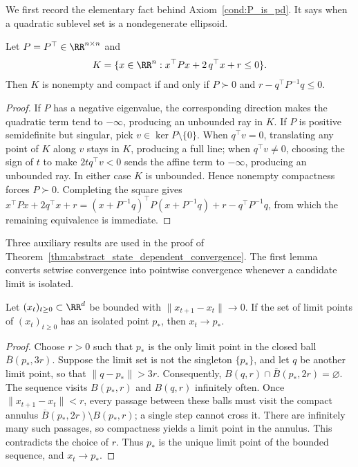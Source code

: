 \documentclass{article}
\begin{document}
We first record the elementary fact behind Axiom~\ref{cond:P_is_pd}. It says when
a quadratic sublevel set is a nondegenerate ellipsoid.

\begin{lemma}\label{lem:compact_quadratic_sublevel}
Let $P=P^\top\in\RR^{n\times n}$ and
\begin{align}
    K = \{x \in \RR^n : x^\top P x + 2\,q^\top x + r \le 0\}.
\end{align}
Then $K$ is nonempty and compact if and only if $P\succ 0$ and
$r - q^\top P^{-1}q \le 0$.
\end{lemma}

\begin{proof}
If $P$ has a negative eigenvalue, the corresponding direction makes the
quadratic term tend to $-\infty$, producing an unbounded ray in $K$.
If $P$ is positive semidefinite but singular, pick $v\in\ker P\setminus\{0\}$.
When $q^\top v=0$, translating any point of $K$ along $v$ stays in $K$,
producing a full line; when $q^\top v\ne 0$, choosing the sign of $t$ to
make $2tq^\top v<0$ sends the affine term to $-\infty$, producing an
unbounded ray. In either case $K$ is unbounded. Hence nonempty
compactness forces $P\succ 0$. Completing the square gives
$x^\top Px + 2q^\top x + r = (x+P^{-1}q)^\top P(x+P^{-1}q) + r - q^\top P^{-1}q$,
from which the remaining equivalence is immediate.
\end{proof}

Three auxiliary results are used in the proof of
Theorem~\ref{thm:abstract_state_dependent_convergence}.
The first lemma converts setwise convergence into pointwise convergence
whenever a candidate limit is isolated.

\begin{lemma}\label{lem:finite_limit_set}
Let $(x_t)_{t\ge 0}\subset\RR^d$ be bounded with $\|x_{t+1}-x_t\|\to 0$. If
the set of limit points of $(x_t)_{t\ge 0}$ has an isolated point
$p_\ast$, then $x_t\to p_\ast$.
\end{lemma}
\begin{proof}
Choose $r>0$ such that $p_\ast$ is the only limit point in the closed ball
$\overline B(p_\ast,3r)$. Suppose the limit set is not the singleton
$\{p_\ast\}$, and let $q$ be another limit point, so that
$\|q-p_\ast\|>3r$. Consequently,
$B(q,r)\cap\overline B(p_\ast,2r)=\varnothing$. The sequence visits
$B(p_\ast,r)$ and $B(q,r)$ infinitely often. Once
$\|x_{t+1}-x_t\|<r$, every passage between these balls must visit the compact
annulus $\overline B(p_\ast,2r)\setminus B(p_\ast,r)$; a single step cannot
cross it. There are infinitely many such passages, so compactness yields a
limit point in the annulus. This contradicts the choice of $r$. Thus $p_\ast$
is the unique limit point of the bounded sequence, and $x_t\to p_\ast$.
\end{proof}
\end{document}
